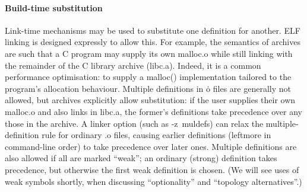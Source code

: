 
\paragraph{Build-time substitution}
Link-time mechanisms may be used to substitute one definition for another.
ELF linking is designed expressly to allow this.
For example, the semantics of archives are such that a C program
may supply its own \textsf{malloc.o} while still linking with 
the remainder of the C library archive (\textsf{libc.a}).
Indeed, it is a common performance optimisation: to supply a 
\textsf{malloc()} implementation tailored to the program's allocation behaviour.
Multiple definitions in \textsf{\.o} files are generally not allowed, but archives
explicitly allow substitution: if the user supplies their own \textsf{malloc.o} and also links in \textsf{libc.a}, the former's definitions take precedence over any those in the archive.
A linker option (such as \textsf{-z~muldefs}) can relax the multiple-definition rule for 
ordinary \textsf{.o} files, causing earlier definitions (leftmore in command-line order) to take precedence over later ones.
Multiple definitions are also allowed if all are marked ``weak'';
an ordinary (strong) definition takes precedence, but otherwise the first weak definition is  chosen.
(We will see uses of weak symbols shortly, when discussing 
``optionality'' and ``topology alternatives''.)


